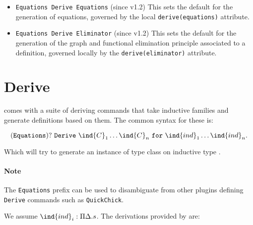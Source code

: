 \begin{itemize}
\item \texttt{Equations Derive Equations} (since v1.2) This sets the default for
  the generation of equations, governed by the local
  \texttt{derive(equations)} attribute.

\item \texttt{Equations Derive Eliminator} (since v1.2) This sets the default for the
  generation of the graph and functional elimination principle
  associated to a definition, governed locally by the
  \texttt{derive(eliminator)} attribute.
\end{itemize}

\section{Derive}

\Equations comes with a suite of deriving commands that take inductive
families and generate definitions based on them. The common syntax for
these is:

\[(\mathtt{Equations})?~\mathtt{Derive}~\ind{C}_1 \ldots \ind{C}_n~\mathtt{for}~\ind{ind}_1 \ldots \ind{ind}_n.\]

Which will try to generate an instance of type class  on
inductive type . 

\paragraph{Note} The \texttt{Equations} prefix can be used to disambiguate
from other plugins defining \texttt{Derive} commands such as \texttt{QuickChick}.  

We assume $\ind{ind}_i : \Pi \Delta. s$. The derivations provided by \Equations are:

